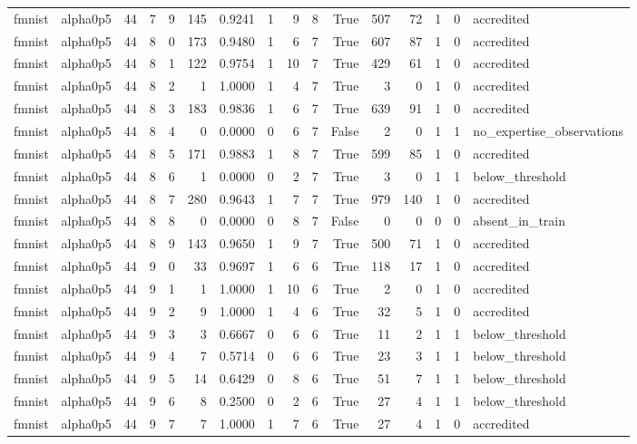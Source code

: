 \begin{tabular}{llrrrrrrrrrrrrrl}
fmnist & alpha0p5 & 44 & 7 & 9 & 145 & 0.9241 & 1 & 9 & 8 & True & 507 & 72 & 1 & 0 & accredited \\
fmnist & alpha0p5 & 44 & 8 & 0 & 173 & 0.9480 & 1 & 6 & 7 & True & 607 & 87 & 1 & 0 & accredited \\
fmnist & alpha0p5 & 44 & 8 & 1 & 122 & 0.9754 & 1 & 10 & 7 & True & 429 & 61 & 1 & 0 & accredited \\
fmnist & alpha0p5 & 44 & 8 & 2 & 1 & 1.0000 & 1 & 4 & 7 & True & 3 & 0 & 1 & 0 & accredited \\
fmnist & alpha0p5 & 44 & 8 & 3 & 183 & 0.9836 & 1 & 6 & 7 & True & 639 & 91 & 1 & 0 & accredited \\
fmnist & alpha0p5 & 44 & 8 & 4 & 0 & 0.0000 & 0 & 6 & 7 & False & 2 & 0 & 1 & 1 & no\_expertise\_observations \\
fmnist & alpha0p5 & 44 & 8 & 5 & 171 & 0.9883 & 1 & 8 & 7 & True & 599 & 85 & 1 & 0 & accredited \\
fmnist & alpha0p5 & 44 & 8 & 6 & 1 & 0.0000 & 0 & 2 & 7 & True & 3 & 0 & 1 & 1 & below\_threshold \\
fmnist & alpha0p5 & 44 & 8 & 7 & 280 & 0.9643 & 1 & 7 & 7 & True & 979 & 140 & 1 & 0 & accredited \\
fmnist & alpha0p5 & 44 & 8 & 8 & 0 & 0.0000 & 0 & 8 & 7 & False & 0 & 0 & 0 & 0 & absent\_in\_train \\
fmnist & alpha0p5 & 44 & 8 & 9 & 143 & 0.9650 & 1 & 9 & 7 & True & 500 & 71 & 1 & 0 & accredited \\
fmnist & alpha0p5 & 44 & 9 & 0 & 33 & 0.9697 & 1 & 6 & 6 & True & 118 & 17 & 1 & 0 & accredited \\
fmnist & alpha0p5 & 44 & 9 & 1 & 1 & 1.0000 & 1 & 10 & 6 & True & 2 & 0 & 1 & 0 & accredited \\
fmnist & alpha0p5 & 44 & 9 & 2 & 9 & 1.0000 & 1 & 4 & 6 & True & 32 & 5 & 1 & 0 & accredited \\
fmnist & alpha0p5 & 44 & 9 & 3 & 3 & 0.6667 & 0 & 6 & 6 & True & 11 & 2 & 1 & 1 & below\_threshold \\
fmnist & alpha0p5 & 44 & 9 & 4 & 7 & 0.5714 & 0 & 6 & 6 & True & 23 & 3 & 1 & 1 & below\_threshold \\
fmnist & alpha0p5 & 44 & 9 & 5 & 14 & 0.6429 & 0 & 8 & 6 & True & 51 & 7 & 1 & 1 & below\_threshold \\
fmnist & alpha0p5 & 44 & 9 & 6 & 8 & 0.2500 & 0 & 2 & 6 & True & 27 & 4 & 1 & 1 & below\_threshold \\
fmnist & alpha0p5 & 44 & 9 & 7 & 7 & 1.0000 & 1 & 7 & 6 & True & 27 & 4 & 1 & 0 & accredited \\

\end{tabular}
